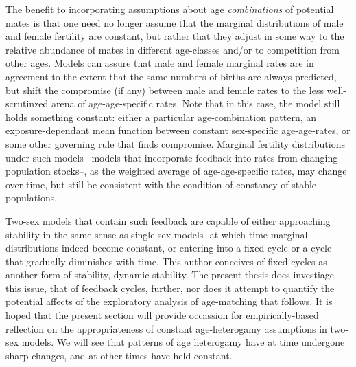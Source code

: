 The benefit to incorporating assumptions about age \textit{combinations} of
potential mates is that one need no longer assume that the marginal
distributions of male and female fertility are constant, but rather that
they adjust in some way to the relative abundance of mates in different
age-classes and/or to competition from other ages. Models can assure
that male and female marginal rates are in agreement to the extent that 
the same numbers of births are always predicted, but shift the
compromise (if any) between male and female rates to the less well-scrutinzed arena of
age-age-specific rates. Note that in this case, the model still holds something
constant: either a particular age-combination pattern, an exposure-dependant
mean function between constant sex-specific age-age-rates, or some other governing rule that finds
compromise. Marginal fertility distributions under such models-- models that
incorporate feedback into rates from changing population stocks--, as the
weighted average of age-age-specific rates, may change over time, but still 
be consistent with the condition of constancy of stable populations.

Two-sex models that contain such feedback are capable of either approaching
stability in the same sense as single-sex models- at which time marginal
distributions indeed become constant, or entering into a fixed
cycle or a cycle that gradually diminishes with time\citep{chung1994cycles}.
This author conceives of fixed cycles as another form of stability, dynamic 
stability. The present thesis does investiage 
this issue, that of feedback cycles, further, nor does it attempt to
quantify the potential affects of the exploratory analysis of age-matching that
follows. It is hoped that the present section will provide
occassion for empirically-based reflection on the appropriateness of
constant age-heterogamy assumptions in two-sex models. We will see that patterns
of age heterogamy have at time undergone sharp changes, and at other times have
held constant.

